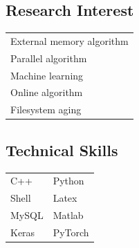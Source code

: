 \documentclass[letterpaper,10pt]{article}
\begin{document}
\begin{minipage}{0.25\textwidth}
\subsection*{Research Interest}
\begin{center}
\begin{tabular*}{\textwidth}{ m{5cm} }
\rowcolor{Gray} External memory algorithm \\
\rowcolor{Gray} Parallel algorithm \\
\rowcolor{Gray} Machine learning \\
\rowcolor{Gray} Online algorithm \\
\rowcolor{Gray} Filesystem aging \\
\end{tabular*}
\end{center}
\subsection*{Technical Skills}
\begin{center}
\begin{tabular*}{\textwidth}{ m{3cm} m{2cm} }
\rowcolor{Gray} C++ & Python \\
\rowcolor{Gray} Shell & Latex \\
\rowcolor{Gray} MySQL & Matlab \\
\rowcolor{Gray} Keras & PyTorch \\
\end{tabular*}
\end{center}
\end{minipage}

\end{document}
